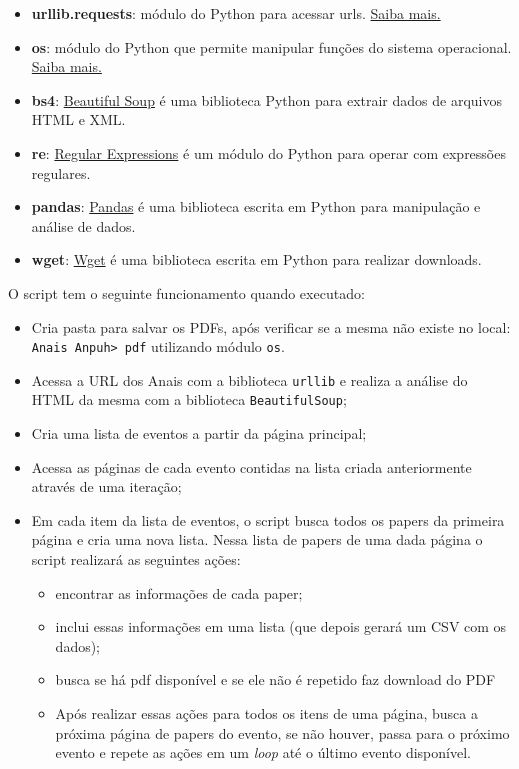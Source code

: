 \documentclass[
]{book}
\providecommand{\tightlist}{%
  \setlength{\itemsep}{0pt}\setlength{\parskip}{0pt}}
\begin{document}
\begin{itemize}
\tightlist
\item
  \textbf{urllib.requests}: módulo do Python para acessar urls. \href{https://docs.python.org/pt-br/3/library/urllib.request.htmll}{Saiba mais.}
\item
  \textbf{os}: módulo do Python que permite manipular funções do sistema operacional. \href{https://docs.python.org/pt-br/3/library/os.html}{Saiba mais.}
\item
  \textbf{bs4}: \href{https://www.crummy.com/software/BeautifulSoup/bs4/doc/}{Beautiful Soup} é uma biblioteca Python para extrair dados de arquivos HTML e XML.
\item
  \textbf{re}: \href{https://docs.python.org/pt-br/3/library/re.html}{Regular Expressions} é um módulo do Python para operar com expressões regulares.
\item
  \textbf{pandas}: \href{https://pandas.pydata.org/}{Pandas} é uma biblioteca escrita em Python para manipulação e análise de dados.
\item
  \textbf{wget}: \href{https://pypi.org/project/wget/}{Wget} é uma biblioteca escrita em Python para realizar downloads.
\end{itemize}

O script tem o seguinte funcionamento quando executado:

\begin{itemize}
\tightlist
\item
  Cria pasta para salvar os PDFs, após verificar se a mesma não existe no local: \texttt{Anais\ Anpuh\textgreater{}\ pdf} utilizando módulo \texttt{os}.
\item
  Acessa a URL dos Anais com a biblioteca \texttt{urllib} e realiza a análise do HTML da mesma com a biblioteca \texttt{BeautifulSoup};
\item
  Cria uma lista de eventos a partir da página principal;
\item
  Acessa as páginas de cada evento contidas na lista criada anteriormente através de uma iteração;
\item
  Em cada item da lista de eventos, o script busca todos os papers da primeira página e cria uma nova lista. Nessa lista de papers de uma dada página o script realizará as seguintes ações:

  \begin{itemize}
  \tightlist
  \item
    encontrar as informações de cada paper;
  \item
    inclui essas informações em uma lista (que depois gerará um CSV com os dados);
  \item
    busca se há pdf disponível e se ele não é repetido faz download do PDF
  \item
    Após realizar essas ações para todos os itens de uma página, busca a próxima página de papers do evento, se não houver, passa para o próximo evento e repete as ações em um \emph{loop} até o último evento disponível.
  \end{itemize}
\end{itemize}
\end{document}
